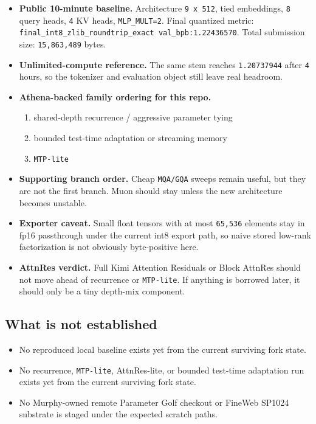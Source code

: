 \documentclass[11pt]{article}
\begin{document}
\begin{itemize}
    \item \textbf{Public 10-minute baseline.}
    Architecture \texttt{9 x 512}, tied embeddings, \texttt{8} query heads, \texttt{4} KV heads, \texttt{MLP\_MULT=2}.
    Final quantized metric: \texttt{final\_int8\_zlib\_roundtrip\_exact val\_bpb:1.22436570}.
    Total submission size: \texttt{15,863,489} bytes.
    \item \textbf{Unlimited-compute reference.}
    The same stem reaches \texttt{1.20737944} after \texttt{4} hours, so the tokenizer and evaluation object still leave real headroom.
    \item \textbf{Athena-backed family ordering for this repo.}
    \begin{enumerate}
        \item shared-depth recurrence / aggressive parameter tying
        \item bounded test-time adaptation or streaming memory
        \item \texttt{MTP-lite}
    \end{enumerate}
    \item \textbf{Supporting branch order.}
    Cheap \texttt{MQA/GQA} sweeps remain useful, but they are not the first branch. Muon should stay unless the new architecture becomes unstable.
    \item \textbf{Exporter caveat.}
    Small float tensors with at most \texttt{65,536} elements stay in fp16 passthrough under the current int8 export path, so naive stored low-rank factorization is not obviously byte-positive here.
    \item \textbf{AttnRes verdict.}
    Full Kimi Attention Residuals or Block AttnRes should not move ahead of recurrence or \texttt{MTP-lite}. If anything is borrowed later, it should only be a tiny depth-mix component.
\end{itemize}

\subsection*{What is not established}

\begin{itemize}
    \item No reproduced local baseline exists yet from the current surviving fork state.
    \item No recurrence, \texttt{MTP-lite}, AttnRes-lite, or bounded test-time adaptation run exists yet from the current surviving fork state.
    \item No Murphy-owned remote Parameter Golf checkout or FineWeb SP1024 substrate is staged under the expected scratch paths.
\end{itemize}
\end{document}
